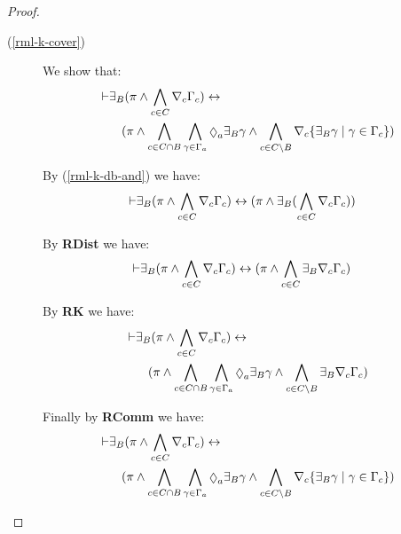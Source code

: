 \begin{proof}
\begin{description}
    \item[(\ref{rml-k-cover})]
    We show that:
    \begin{align*}
        \proves & \displaystyle \somerefsBs (\pi \land \bigwedge_{\agentC \in \agentsC} \coverC \Gamma_\agentC) \iff \\&\quad
            (
            \pi \land
            \bigwedge_{\agentC \in \agentsC \cap \agentsB} \bigwedge_{\gamma \in \Gamma_\agentA} \possibleA \somerefsBs \gamma \land
            \bigwedge_{\agentC \in \agentsC \setminus \agentsB} \coversC \{\somerefsBs \gamma \mid \gamma \in \Gamma_\agentC\} 
            )
    \end{align*}

    By (\ref{rml-k-db-and}) we have:
    \begin{align*}
    \vdash & \displaystyle {\exists_{B}} (\pi \land \bigwedge_{c \in C} \nabla_{c} \Gamma_c) \leftrightarrow 
            (
            \pi \land
            {\exists_{B}} (\bigwedge_{c \in C} \nabla_{c} \Gamma_c)
            )
        \end{align*}

    By {\bf RDist} we have:
    \begin{align*}
    \vdash & \displaystyle {\exists_{B}} (\pi \land \bigwedge_{c \in C} \nabla_{c} \Gamma_c) \leftrightarrow 
            (
            \pi \land
            \bigwedge_{c \in C} {\exists_{B}} \nabla_{c} \Gamma_c
            )
    \end{align*}

    By {\bf RK} we have:
    \begin{align*}
        \proves & \displaystyle \somerefsBs (\pi \land \bigwedge_{\agentC \in \agentsC} \coverC \Gamma_\agentC) \iff \\&\quad
            (
            \pi \land
            \bigwedge_{\agentC \in \agentsC \cap \agentsB} \bigwedge_{\gamma \in \Gamma_\agentA} \possibleA \somerefsBs \gamma \land
            \bigwedge_{\agentC \in \agentsC \setminus \agentsB} \somerefsBs \coverC \Gamma_\agentC
            )
    \end{align*}

    Finally by {\bf RComm} we have:
    \begin{align*}
        \proves & \displaystyle \somerefsBs (\pi \land \bigwedge_{\agentC \in \agentsC} \coverC \Gamma_\agentC) \iff \\&\quad
            (
            \pi \land
            \bigwedge_{\agentC \in \agentsC \cap \agentsB} \bigwedge_{\gamma \in \Gamma_\agentA} \possibleA \somerefsBs \gamma \land
            \bigwedge_{\agentC \in \agentsC \setminus \agentsB} \coversC \{\somerefsBs \gamma \mid \gamma \in \Gamma_\agentC\} 
            )
    \end{align*}
    \end{description}
\end{proof}


